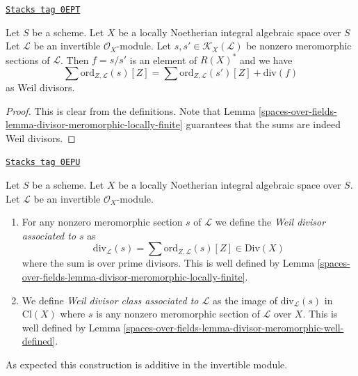 \begin{lemma}
\label{spaces-over-fields-lemma-divisor-meromorphic-well-defined}
\href{https://stacks.math.columbia.edu/tag/0EPT}{\texttt{Stacks tag 0EPT}}

Let $S$ be a scheme. Let $X$ be a locally Noetherian integral algebraic space
over $S$ Let $\mathcal{L}$ be an invertible $\mathcal{O}_X$-module.
Let $s, s' \in \mathcal{K}_X(\mathcal{L})$ be nonzero
meromorphic sections of $\mathcal{L}$. Then $f = s/s'$
is an element of $R(X)^*$ and we have
$$
\sum \text{ord}_{Z, \mathcal{L}}(s)[Z]
=
\sum \text{ord}_{Z, \mathcal{L}}(s')[Z]
+
\text{div}(f)
$$
as Weil divisors.
\end{lemma}

\begin{proof}
This is clear from the definitions.
Note that Lemma \ref{spaces-over-fields-lemma-divisor-meromorphic-locally-finite}
guarantees that the sums are indeed Weil divisors.
\end{proof}

\begin{definition}
\label{spaces-over-fields-definition-divisor-invertible-sheaf}
\href{https://stacks.math.columbia.edu/tag/0EPU}{\texttt{Stacks tag 0EPU}}

Let $S$ be a scheme. Let $X$ be a locally Noetherian integral algebraic space
over $S$. Let $\mathcal{L}$ be an invertible $\mathcal{O}_X$-module.
\begin{enumerate}
\item For any nonzero meromorphic section $s$ of $\mathcal{L}$
we define the {\it Weil divisor associated to $s$} as
$$
\text{div}_\mathcal{L}(s) =
\sum \text{ord}_{Z, \mathcal{L}}(s) [Z] \in \text{Div}(X)
$$
where the sum is over prime divisors. This is well defined by
Lemma \ref{spaces-over-fields-lemma-divisor-meromorphic-locally-finite}.
\item We define {\it Weil divisor class associated to $\mathcal{L}$}
as the image of $\text{div}_\mathcal{L}(s)$ in $\text{Cl}(X)$
where $s$ is any nonzero meromorphic section of $\mathcal{L}$ over $X$.
This is well defined by
Lemma \ref{spaces-over-fields-lemma-divisor-meromorphic-well-defined}.
\end{enumerate}
\end{definition}

As expected this construction is additive in the invertible module.

